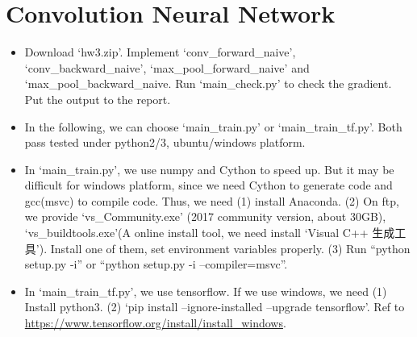 \documentclass[12pt]{article}
\begin{document}
\section{Convolution Neural Network}

\begin{itemize}
	\item Download `hw3.zip'. Implement `conv\_forward\_naive', `conv\_backward\_naive', `max\_pool\_forward\_naive' and `max\_pool\_backward\_naive. Run `main\_check.py' to check the gradient. Put the output to the report. 
	\item In the following, we can choose `main\_train.py' or `main\_train\_tf.py'. Both pass tested under python2/3, ubuntu/windows platform. 
	\item In `main\_train.py',   we use  numpy and Cython to speed up. But it may be difficult for windows platform, since we need Cython to generate code and gcc(msvc) to compile code. Thus, we need (1) install Anaconda. (2) On ftp, we provide  `vs\_Community.exe' (2017 community version, about 30GB), `vs\_buildtools.exe'(A online install tool, we need install `Visual C++ 生成工具'). Install one of them, set environment variables properly. (3) Run ``python setup.py -i'' or ``python setup.py -i --compiler=msvc''. 
	\item In `main\_train\_tf.py', we use tensorflow. If we use windows, we need (1) Install python3. (2) `pip install --ignore-installed --upgrade tensorflow'. Ref to \url{https://www.tensorflow.org/install/install_windows}. 

\end{itemize}
\end{document}
